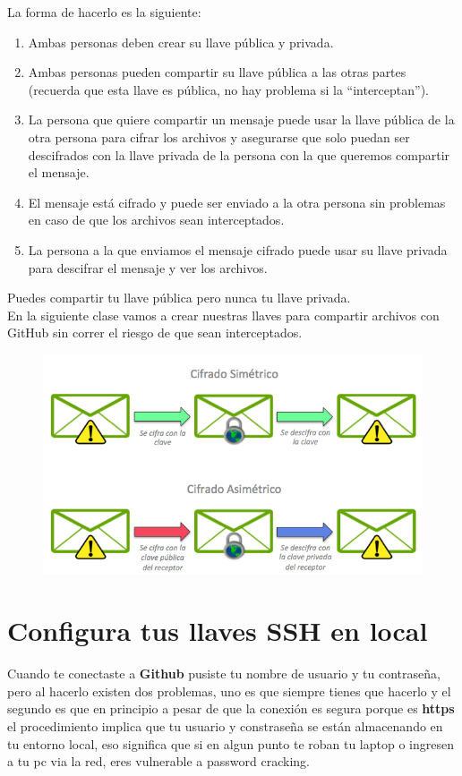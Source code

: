 \documentclass{article}
\begin{document}
La forma de hacerlo es la siguiente:

\begin{enumerate}
  \item Ambas personas deben crear su llave pública y privada.
  \item Ambas personas pueden compartir su llave pública a las otras partes
    (recuerda que esta llave es pública, no hay problema si la “interceptan”).
  \item La persona que quiere compartir un mensaje puede usar la llave pública
    de la otra persona para cifrar los archivos y asegurarse que solo puedan
    ser descifrados con la llave privada de la persona con la que queremos
    compartir el mensaje.
  \item El mensaje está cifrado y puede ser enviado a la otra persona sin
    problemas en caso de que los archivos sean interceptados.
  \item La persona a la que enviamos el mensaje cifrado puede usar su llave
    privada para descifrar el mensaje y ver los archivos.
\end{enumerate}

Puedes compartir tu llave pública pero nunca tu llave privada.\\

En la siguiente clase vamos a crear nuestras llaves para compartir archivos con
GitHub sin correr el riesgo de que sean interceptados.\\

\begin{figure}[h!]
  \centering
  \includegraphics[scale=0.6]{./Pictures/210_asimetrico.png}
\end{figure}



\newpage
\section{Configura tus llaves SSH en local}%
Cuando te conectaste a \textbf{Github} pusiste tu nombre de usuario y tu
contraseña, pero al hacerlo existen dos problemas, uno es que siempre tienes
que hacerlo y el segundo es que en principio a pesar de que la conexión es
segura porque es \textbf{https} el procedimiento implica que tu usuario y
constraseña se están almacenando en tu entorno local, eso significa que si en
algun punto te roban tu laptop o ingresen a tu pc via la red, eres vulnerable a
password cracking.\\
\end{document}
